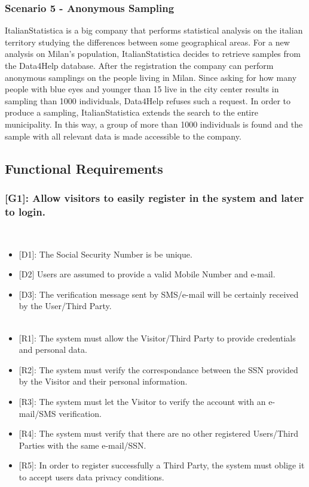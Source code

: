 \documentclass[12pt,a4paper]{article}
\begin{document}
	\subsubsection*{Scenario 5 - Anonymous Sampling}
		ItalianStatistica is a big company that performs statistical analysis on the italian territory studying the differences between some geographical areas. For a new analysis on Milan's population, ItalianStatistica decides to retrieve samples from the Data4Help database. After the registration the company can perform anonymous samplings on the people living in Milan. Since asking for how many people with blue eyes and younger than 15 live in the city center results in sampling than 1000 individuals, Data4Help refuses such a request. In order to produce a sampling, ItalianStatistica extends the search to the entire municipality. In this way, a group of more than 1000 individuals is found and the sample with all relevant data is made accessible to the company.

	\newpage

	\subsection{Functional Requirements}

	\subsubsection*{{[}{G1}{]}: Allow visitors to easily register in the system and later to login.}
	\begin{itemize}\\
		\begin{itemize}
			\item {[D1]}: The Social Security Number is be unique.
			\item {[D2]} Users are assumed to provide a valid Mobile Number and e-mail.
			\item {[D3]}: The verification message sent by SMS/e-mail will be certainly received by the User/Third Party.
			\\\\
			\item {[R1]}: The system must allow the Visitor/Third Party to provide credentials and personal data.
			\item {[R2]}: The system must verify the correspondance between the SSN provided by the Visitor and their personal information.
			\item {[R3]}: The system must let the Visitor to verify the account with an e-mail/SMS verification.
			\item {[R4]}: The system must verify that there are no other registered Users/Third Parties with the same e-mail/SSN.
			\item {[R5]}: In order to register successfully a Third Party, the system must oblige it to accept users data privacy conditions.
		\end{itemize}
	\end{itemize}
\end{document}
